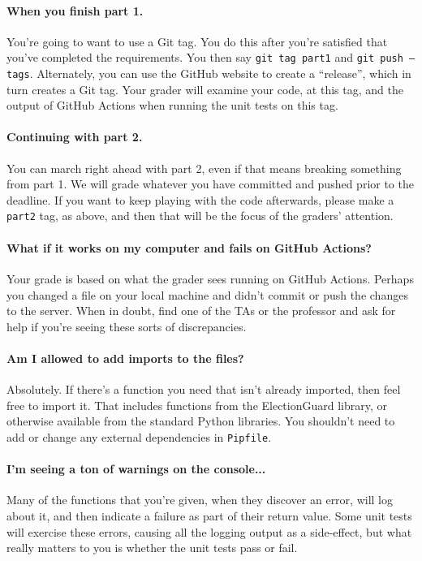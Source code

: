 \documentclass[letterpaper,12pt]{article}
\begin{document}
\paragraph{When you finish part 1.} You're going to want to use a Git
tag. You do this after you're satisfied that you've completed the
requirements. You then say {\tt git tag part1} and {\tt git push
  --tags}. Alternately, you can use the GitHub website to create a
``release'', which in turn creates a Git tag. Your grader will
examine your code, at this tag, and the output of GitHub Actions
when running the unit tests on this tag.

\paragraph{Continuing with part 2.} You can march right ahead with
part 2, even if that means breaking something from part 1. We
will grade whatever you have committed and pushed prior to the
deadline. If you want to keep playing with the code afterwards,
please make a {\tt part2} tag, as above, and then that will
be the focus of the graders' attention.

\paragraph{What if it works on my computer and fails on GitHub
  Actions?} Your grade is based on what the grader sees running on
GitHub Actions. Perhaps you changed a file on your local machine and
didn't commit or push the changes to the server. When in doubt,
find one of the TAs or the professor and ask for help if you're
seeing these sorts of discrepancies.

\paragraph{Am I allowed to add imports to the files?} Absolutely. If
there's a function you need that isn't already imported, then feel
free to import it. That includes functions from the ElectionGuard
library, or otherwise available from the standard Python libraries.
You shouldn't need to add or change any external dependencies in
{\tt Pipfile}.

\paragraph{I'm seeing a ton of warnings on the console...} Many of the
functions that you're given, when they discover an error, will
log about it, and then indicate a failure as part of their return
value. Some unit tests will exercise these errors, causing all
the logging output as a side-effect, but what really matters to
you is whether the unit tests pass or fail.
\end{document}
